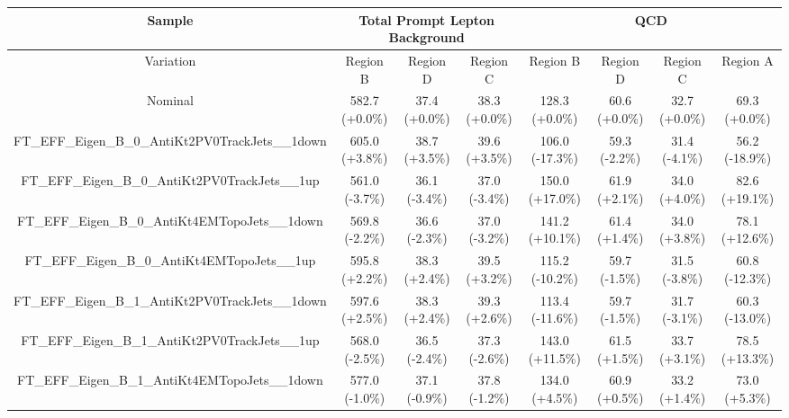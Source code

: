 \begin{table}[htbp!]
\begin{tiny}
\begin{center}
\begin{tabular}{c|c|c|c||c|c|c|c}
Sample                                                          &\multicolumn{3}{c||}{Total Prompt Lepton Background}      &\multicolumn{4}{c}{QCD}                                                  \\
\hline  
Variation                                                       & Region B       & Region D         & Region C           & Region B        & Region D         & Region C          & Region A         \\ 
\hline  
Nominal                                                      & 582.7     (+0.0\%) & 37.4      (+0.0\%) & 38.3      (+0.0\%) & 128.3     (+0.0\%) & 60.6      (+0.0\%) & 32.7      (+0.0\%) & 69.3      (+0.0\%) \\ 
\hline
FT\_EFF\_Eigen\_B\_0\_AntiKt2PV0TrackJets\_\_1down           & 605.0     (+3.8\%) & 38.7      (+3.5\%) & 39.6      (+3.5\%) & 106.0     (-17.3\%) & 59.3      (-2.2\%) & 31.4      (-4.1\%) & 56.2      (-18.9\%) \\ 
FT\_EFF\_Eigen\_B\_0\_AntiKt2PV0TrackJets\_\_1up             & 561.0     (-3.7\%) & 36.1      (-3.4\%) & 37.0      (-3.4\%) & 150.0     (+17.0\%) & 61.9      (+2.1\%) & 34.0      (+4.0\%) & 82.6      (+19.1\%) \\ 
FT\_EFF\_Eigen\_B\_0\_AntiKt4EMTopoJets\_\_1down             & 569.8     (-2.2\%) & 36.6      (-2.3\%) & 37.0      (-3.2\%) & 141.2     (+10.1\%) & 61.4      (+1.4\%) & 34.0      (+3.8\%) & 78.1      (+12.6\%) \\ 
FT\_EFF\_Eigen\_B\_0\_AntiKt4EMTopoJets\_\_1up               & 595.8     (+2.2\%) & 38.3      (+2.4\%) & 39.5      (+3.2\%) & 115.2     (-10.2\%) & 59.7      (-1.5\%) & 31.5      (-3.8\%) & 60.8      (-12.3\%) \\ 
FT\_EFF\_Eigen\_B\_1\_AntiKt2PV0TrackJets\_\_1down           & 597.6     (+2.5\%) & 38.3      (+2.4\%) & 39.3      (+2.6\%) & 113.4     (-11.6\%) & 59.7      (-1.5\%) & 31.7      (-3.1\%) & 60.3      (-13.0\%) \\ 
FT\_EFF\_Eigen\_B\_1\_AntiKt2PV0TrackJets\_\_1up             & 568.0     (-2.5\%) & 36.5      (-2.4\%) & 37.3      (-2.6\%) & 143.0     (+11.5\%) & 61.5      (+1.5\%) & 33.7      (+3.1\%) & 78.5      (+13.3\%) \\ 
FT\_EFF\_Eigen\_B\_1\_AntiKt4EMTopoJets\_\_1down             & 577.0     (-1.0\%) & 37.1      (-0.9\%) & 37.8      (-1.2\%) & 134.0     (+4.5\%) & 60.9      (+0.5\%) & 33.2      (+1.4\%) & 73.0      (+5.3\%) \\ 

\end{tabular}
\end{center}
\end{tiny}
\end{table}
